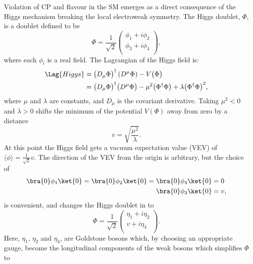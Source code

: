 Violation of CP and flavour in the SM emerges as a direct consequence of the Higgs mechanism
breaking the local electroweak symmetry.
The Higgs doublet, $\Phi$, is a doublet defined to be
\begin{equation}
  \Phi = \frac{1}{\sqrt{2}}
  \begin{pmatrix}
    \phi_1 + i\phi_2 \\
    \phi_3 + i\phi_4 \\
  \end{pmatrix},
  \label{eq:th:phi}
\end{equation}
where each $\phi_i$ is a real field.
The Lagrangian of the Higgs field is:
\begin{align}
  \Lag{Higgs}
  &= \big(D_\mu\Phi\big)^\dagger\left(D^\mu\Phi\right) - V\big(\Phi\big) \nonumber\\
  &= \big(D_\mu\Phi\big)^\dagger\big(D^\mu\Phi\big) - \mu^2\big(\Phi^\dagger\Phi\big) +
  \lambda\big(\Phi^\dagger\Phi\big)^{2},
  \label{eq:th:laghiggs1}
\end{align}
where $\mu$ and $\lambda$ are constants, and $D_\mu$ is the covariant derivative.
Taking $\mu^2<0$ and $\lambda>0$ shifts the minimum of the potential $V(\Phi)$ away from zero by a distance
\begin{equation}
  v = \sqrt{\frac{\mu^2}{\lambda}}.
\end{equation}
At this point the Higgs field gets a vacuum expectation value (VEV)
of $\langle\phi\rangle = \tfrac{1}{\sqrt{2}}v$.
The direction of the VEV from the origin is arbitrary, but the choice of
\begin{align}
  \bra{0}\phi_1\ket{0} =
  \bra{0}\phi_2\ket{0} =
  \bra{0}\phi_4\ket{0} &= 0 \nonumber\\
  \bra{0}\phi_3\ket{0} &= v,
\end{align}
is convenient, and changes the Higgs doublet in  to
\begin{equation}
  \Phi = \frac{1}{\sqrt{2}}
  \begin{pmatrix}
    \eta_1 + i\eta_2 \\
    v + i\eta_4 \\
  \end{pmatrix}.
  \label{eq:th:eta}
\end{equation}
Here, $\eta_1$, $\eta_2$ and $\eta_4$, are Goldstone bosons which, by choosing an appropriate
gauge, become the longitudinal components of the weak bosons which simplifies $\Phi$ to
